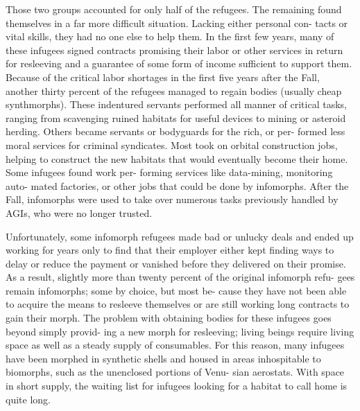 Those two groups accounted for only half of the 
refugees. The remaining found themselves in a far 
more difficult situation. Lacking either personal con-
tacts or vital skills, they had no one else to help them. 
In the first few years, many of these infugees signed 
contracts promising their labor or other services in 
return for resleeving and a guarantee of some form 
of income sufficient to support them. Because of the 
critical labor shortages in the first five years after the 
Fall, another thirty percent of the refugees managed 
to regain bodies (usually cheap synthmorphs). These 
indentured servants performed all manner of critical 
tasks, ranging from scavenging ruined habitats for 
useful devices to mining or asteroid herding. Others 
became servants or bodyguards for the rich, or per-
formed less moral services for criminal syndicates. 
Most took on orbital construction jobs, helping to 
construct the new habitats that would eventually 
become their home. Some infugees found work per-
forming services like data-mining, monitoring auto-
mated factories, or other jobs that could be done by 
infomorphs. After the Fall, infomorphs were used to 
take over numerous tasks previously handled by AGIs, 
who were no longer trusted.

Unfortunately, some infomorph refugees made bad 
or unlucky deals and ended up working for years only 
to find that their employer either kept finding ways to 
delay or reduce the payment or vanished before they 
delivered on their promise. As a result, slightly more 
than twenty percent of the original infomorph refu-
gees remain infomorphs; some by choice, but most be-
cause they have not been able to acquire the means to 
resleeve themselves or are still working long contracts 
to gain their morph. The problem with obtaining 
bodies for these infugees goes beyond simply provid-
ing a new morph for resleeving; living beings require 
living space as well as a steady supply of consumables. 
For this reason, many infugees have been morphed in 
synthetic shells and housed in areas inhospitable to 
biomorphs, such as the unenclosed portions of Venu-
sian aerostats. With space in short supply, the waiting 
list for infugees looking for a habitat to call home is 
quite long.

